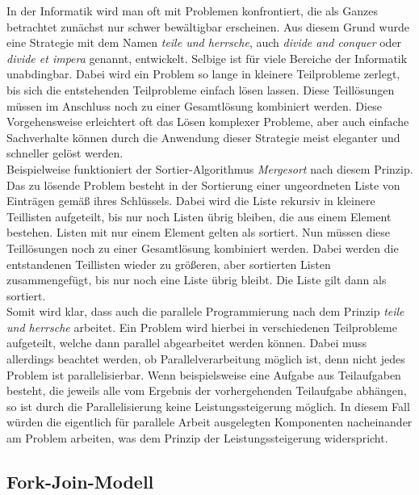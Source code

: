 			In der Informatik wird man oft mit Problemen konfrontiert, die als Ganzes betrachtet zunächst nur schwer bewältigbar erscheinen. Aus diesem Grund wurde eine Strategie mit dem Namen \textit{teile und herrsche}, auch \textit{divide and conquer} oder \textit{divide et impera} genannt, entwickelt. Selbige ist für viele Bereiche der Informatik unabdingbar. Dabei wird ein Problem so lange in kleinere Teilprobleme zerlegt, bis sich die entstehenden Teilprobleme einfach lösen lassen. Diese Teillösungen müssen im Anschluss noch zu einer Gesamtlösung kombiniert werden. Diese Vorgehensweise erleichtert oft das Lösen komplexer Probleme, aber auch einfache Sachverhalte können durch die Anwendung dieser Strategie meist eleganter und schneller gelöst werden. \cite{TeileUndHerrsche}\\
			Beispielweise funktioniert der Sortier-Algorithmus \textit{Mergesort} nach diesem Prinzip. Das zu lösende Problem besteht in der Sortierung einer ungeordneten Liste von Einträgen gemäß ihres Schlüssels. Dabei wird die Liste rekursiv in kleinere Teillisten aufgeteilt, bis nur noch Listen übrig bleiben, die aus einem Element bestehen. Listen mit nur einem Element gelten als sortiert. Nun müssen diese Teillösungen noch zu einer Gesamtlösung kombiniert werden. Dabei werden die entstandenen Teillisten wieder zu größeren, aber sortierten Listen zusammengefügt, bis nur noch eine Liste übrig bleibt. Die Liste gilt dann als sortiert. \cite{EinfacheSortierverfahren}\\
			Somit wird klar, dass auch die parallele Programmierung nach dem Prinzip \textit{teile und herrsche} arbeitet. Ein Problem wird hierbei in verschiedenen Teilprobleme aufgeteilt, welche dann parallel abgearbeitet werden können. Dabei muss allerdings beachtet werden, ob Parallelverarbeitung möglich ist, denn nicht jedes Problem ist parallelisierbar. Wenn beispielsweise eine Aufgabe aus Teilaufgaben besteht, die jeweils alle vom Ergebnis der vorhergehenden Teilaufgabe abhängen, so ist durch die Parallelisierung keine Leistungssteigerung möglich. In diesem Fall würden die eigentlich für parallele Arbeit ausgelegten Komponenten nacheinander am Problem arbeiten, was dem Prinzip der Leistungssteigerung widerspricht.

		\subsection{Fork-Join-Modell}
			\label{ForkJoinModell}
			
